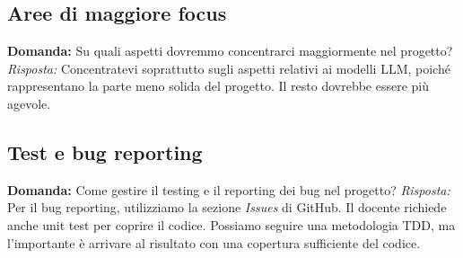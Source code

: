 \documentclass{article}
\begin{document}
\subsection{Aree di maggiore focus} \textbf{Domanda:} Su quali aspetti dovremmo concentrarci maggiormente nel progetto?
\newline
\textit{Risposta:} Concentratevi soprattutto sugli aspetti relativi ai modelli LLM, poiché rappresentano la parte meno solida del progetto. Il resto dovrebbe essere più agevole.

\subsection{Test e bug reporting} \textbf{Domanda:} Come gestire il testing e il reporting dei bug nel progetto?
\newline
\textit{Risposta:} Per il bug reporting, utilizziamo la sezione \textit{Issues} di GitHub. Il docente richiede anche unit test per coprire il codice. Possiamo seguire una metodologia TDD, ma l'importante è arrivare al risultato con una copertura sufficiente del codice.
\end{document}
